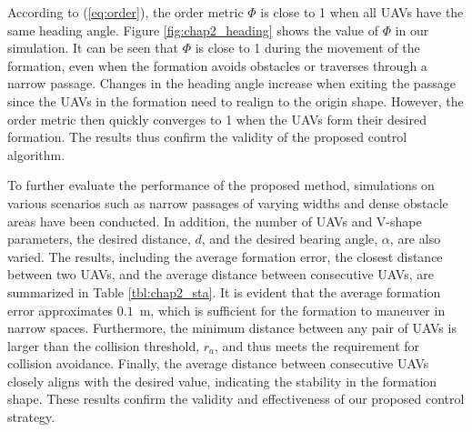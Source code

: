 According to (\ref{eq:order}), the order metric $\Phi$ is close to 1 when all UAVs have the same heading angle. Figure \ref{fig:chap2_heading} shows the value of $\Phi$ in our simulation. It can be seen that $\Phi$ is close to 1 during the movement of the formation, even when the formation avoids obstacles or traverses through a narrow passage. Changes in the heading angle increase when exiting the passage since the UAVs in the formation need to realign to the origin shape. However, the order metric then quickly converges to 1 when the UAVs form their desired formation. The results thus confirm the validity of the proposed control algorithm.

To further evaluate the performance of the proposed method, simulations on various scenarios such as narrow passages of varying widths and dense obstacle areas have been conducted. In addition, the number of UAVs and V-shape parameters, the desired distance, $d$, and the desired bearing angle, $\alpha$, are also varied. The results, including the average formation error, the closest distance between two UAVs, and the average distance between consecutive UAVs, are summarized in Table {\ref{tbl:chap2_sta}}. It is evident that the average formation error approximates $0.1$~m, which is sufficient for the formation to maneuver in narrow spaces. Furthermore, the minimum distance between any pair of UAVs is larger than the collision threshold, $r_a$, and thus meets the requirement for collision avoidance. Finally, the average distance between consecutive UAVs closely aligns with the desired value, indicating the stability in the formation shape. These results confirm the validity and effectiveness of our proposed control strategy.